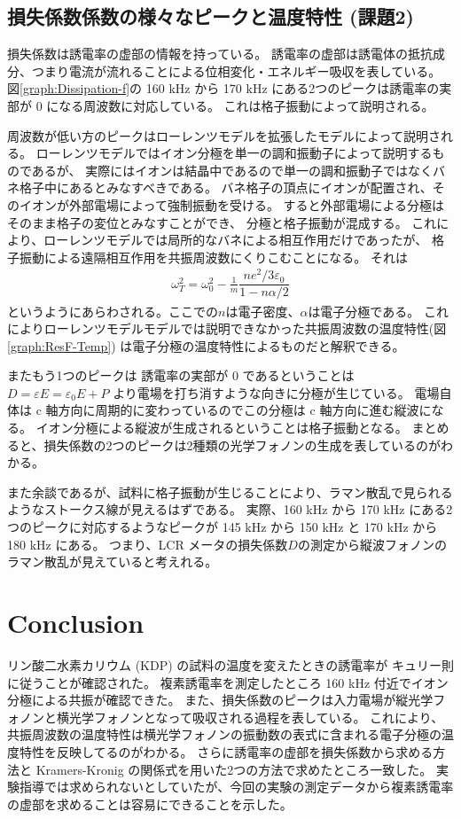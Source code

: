 \documentclass[9pt,dvipdfmx,a4paper]{jsarticle}
\begin{document}
\subsection{損失係数係数の様々なピークと温度特性 (課題2)}
損失係数は誘電率の虚部の情報を持っている。
誘電率の虚部は誘電体の抵抗成分、つまり電流が流れることによる位相変化・エネルギー吸収を表している。
図\ref{graph:Dissipation-f}の 160 kHz から 170 kHz にある2つのピークは誘電率の実部が 0 になる周波数に対応している。
これは格子振動によって説明される。

周波数が低い方のピークはローレンツモデルを拡張したモデルによって説明される。
ローレンツモデルではイオン分極を単一の調和振動子によって説明するものであるが、
実際にはイオンは結晶中であるので単一の調和振動子ではなくバネ格子中にあるとみなすべきである。
バネ格子の頂点にイオンが配置され、そのイオンが外部電場によって強制振動を受ける。
すると外部電場による分極はそのまま格子の変位とみなすことができ、
分極と格子振動が混成する。
これにより、ローレンツモデルでは局所的なバネによる相互作用だけであったが、
格子振動による遠隔相互作用を共振周波数にくりこむことになる。
それは
\begin{align}
    \omega_T^2 = \omega_0^2 - \frac{1}{m}\dfrac{ne^2 /3\varepsilon_0}{1-n\alpha/2}
\end{align}
というようにあらわされる。ここでの\(n\)は電子密度、\(\alpha\)は電子分極である。
これによりローレンツモデルモデルでは説明できなかった共振周波数の温度特性(図\ref{graph:ResF-Temp})
は電子分極の温度特性によるものだと解釈できる。

またもう1つのピークは
誘電率の実部が 0 であるということは\(D = \varepsilon E = \varepsilon_0 E + P\)
より電場を打ち消すような向きに分極が生じている。
電場自体は c 軸方向に周期的に変わっているのでこの分極は c 軸方向に進む縦波になる。
イオン分極による縦波が生成されるということは格子振動となる。
まとめると、損失係数の2つのピークは2種類の光学フォノンの生成を表しているのがわかる。

また余談であるが、試料に格子振動が生じることにより、ラマン散乱で見られるようなストークス線が見えるはずである。
実際、160 kHz から 170 kHz にある2つのピークに対応するようなピークが 145 kHz から 150 kHz と 170 kHz から 180 kHz にある。
つまり、LCR メータの損失係数\(D\)の測定から縦波フォノンのラマン散乱が見えていると考えれる。

\section{Conclusion}
リン酸二水素カリウム (KDP) の試料の温度を変えたときの誘電率が
キュリー則に従うことが確認された。
複素誘電率を測定したところ 160 kHz 付近でイオン分極による共振が確認できた。
また、損失係数のピークは入力電場が縦光学フォノンと横光学フォノンとなって吸収される過程を表している。
これにより、共振周波数の温度特性は横光学フォノンの振動数の表式に含まれる電子分極の温度特性を反映してるのがわかる。
さらに誘電率の虚部を損失係数から求める方法と Kramers-Kronig の関係式を用いた2つの方法で求めたところ一致した。
実験指導では求められないとしていたが、今回の実験の測定データから複素誘電率の虚部を求めることは容易にできることを示した。
\end{document}
